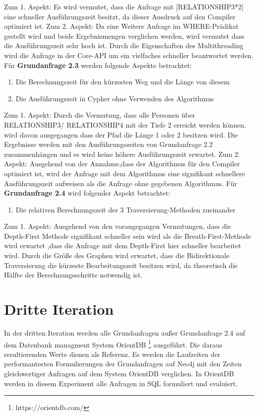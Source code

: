 Zum 1. Aspekt: Es wird vermutet, dass die Anfrage mit [RELATIONSHIP3*2] eine schneller Ausführungszeit besitzt, da dieser Ausdruck auf den Compiler optimiert ist. \newline
Zum 2. Aspekt: Da eine Weitere Anfrage im WHERE-Prädikat gestellt wird und beide Ergebnismengen verglichen werden, wird vermutet dass die Ausführungszeit sehr hoch ist. Durch die Eigenschaften des Multithreading wird die Anfrage in der Core-API um ein vielfaches schneller beantwortet werden. \newline  \newline
Für \textbf{Grundanfrage 2.3} werden folgende Aspekte betrachtet: 
\begin{enumerate}
	\item Die Berechnungszeit für den kürzesten Weg und die Länge von diesem
	\item Die Ausführungszeit in Cypher ohne Verwenden des Algorithmus
\end{enumerate}
Zum 1. Aspekt: Durch die Vermutung, dass alle Personen über RELATIONSHIP3/ RELATIONSHIP4 mit der Tiefe 2 erreicht werden können, wird davon ausgegangen dass der Pfad die Länge 1 oder 2 besitzen  wird. Die Ergebnisse werden mit den Ausführungszeiten von Grundanfrage 2.2 zusammenhängen und es wird keine höhere Ausführungszeit erwartet. \newline
Zum 2. Aspekt: Ausgehend von der Annahme,dass der Algorithmus für den Compiler optimiert ist, wird der Anfrage mit dem Algorithmus eine signifikant schnellere Ausführungszeit aufweisen als die Anfrage ohne gegebenen Algorithmus. \newline \newline
Für \textbf{Grundanfrage 2.4} wird folgender Aspekt betrachtet:
\begin{enumerate}
	\item Die relativen Berechnungszeit der 3 Traversierung-Methoden zueinander
\end{enumerate}
Zum 1. Aspekt: Ausgehend von den vorangegangen Vermutungen, dass die Depth-First Methode signifikant schneller sein wird  als die Breath-First-Methode wird erwartet ,dass die Anfrage mit dem Depth-First hier schneller bearbeitet wird. Durch die Größe des Graphen wird erwartet, dass die Bidirektionale Traversierung die kürzeste Bearbeitungszeit besitzen wird, da theoretisch die Hälfte der Berechnungsschritte notwendig ist. 
\section{Dritte Iteration}
In der dritten Iteration werden alle Grundanfragen außer Grundanfrage 2.4 auf dem Datenbank managment System OrientDB \footnote{https://orientdb.com/} ausgeführt. Die daraus resultierenden Werte dienen als Referenz. Es werden die Laufzeiten der performantesten Formulierungen der Grundanfragen auf Neo4j mit den Zeiten gleichwertiger Anfragen auf dem System OrientDB verglichen. In OrientDB werden in diesem Experiment alle Anfragen in SQL formuliert und evaluiert.  
